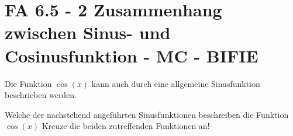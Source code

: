 \section{FA 6.5 - 2 Zusammenhang zwischen Sinus- und Cosinusfunktion - MC - BIFIE}

\begin{beispiel}[FA 6.5]{1} %
				Die Funktion $\cos(x)$ kann auch durch eine allgemeine Sinusfunktion beschrieben werden.

Welche der nachstehend angeführten Sinusfunktionen beschreiben die Funktion $\cos(x)$
Kreuze die beiden zutreffenden Funktionen an!

\end{beispiel}